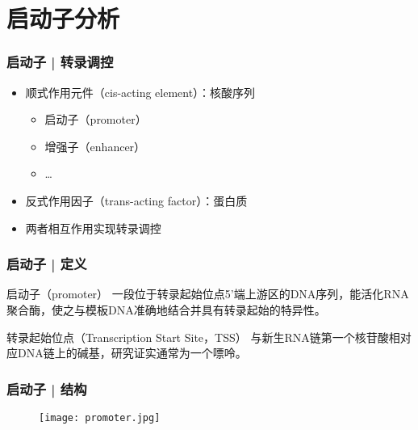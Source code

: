 \section{启动子分析}
\begin{frame}
  \frametitle{启动子 | 转录调控}
  \begin{itemize}
    \item 顺式作用元件（cis-acting element）：核酸序列
      \begin{itemize}
        \item 启动子（promoter）
        \item 增强子（enhancer）
        \item \ldots
      \end{itemize}
    \item 反式作用因子（trans-acting factor）：蛋白质
    \item 两者相互作用实现转录调控
  \end{itemize}
\end{frame}

\begin{frame}
  \frametitle{启动子 | 定义}
  \begin{block}{启动子（promoter）}
    一段位于转录起始位点5'端上游区的DNA序列，能活化RNA聚合酶，使之与模板DNA准确地结合并具有转录起始的特异性。
  \end{block}
  \pause
  \begin{block}{转录起始位点（Transcription Start Site，TSS）}
    与新生RNA链第一个核苷酸相对应DNA链上的碱基，研究证实通常为一个嘌呤。
  \end{block}
\end{frame}

\begin{frame}
  \frametitle{启动子 | 结构}
  \begin{figure}
    \centering
    \texttt{[image: promoter.jpg]}
  \end{figure}
\end{frame}

